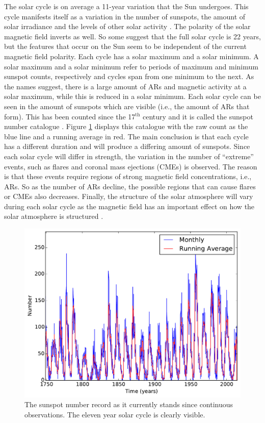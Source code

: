     The solar cycle is on average a 11-year variation that the Sun undergoes.
    This cycle manifests itself as a variation in the number of sunspots, the amount of solar irradiance and the levels of other solar activity \citep{climate}.
    The polarity of the solar magnetic field inverts as well.
    So some suggest that the full solar cycle is 22 years, but the features that occur on the Sun seem to be independent of the current magnetic field polarity. 
    Each cycle has a solar maximum and a solar minimum.
    A solar maximum and a solar minimum refer to periods of maximum and minimum sunspot counts, respectively and cycles span from one minimum to the next.
    As the names suggest, there is a large amount of ARs and magnetic activity at a solar maximum, while this is reduced in a solar minimum.
    Each solar cycle can be seen in the amount of sunspots which are visible (i.e., the amount of ARs that form).
    This has been counted since the 17$^{\mathrm{th}}$ century and it is called the sunspot number catalogue \citep{Eddy18061976}.
    Figure \ref{fig:AR_Num} displays this catalogue with the raw count as the blue line and a running average in red.
    The main conclusion is that each cycle has a different duration and will produce a differing amount of sunspots.
    Since each solar cycle will differ in strength, the variation in the number of ``extreme'' events, such as flares and coronal mass ejections (CMEs) is observed.
    The reason is that these events require regions of strong magnetic field concentrations, i.e., ARs.
    So as the number of ARs decline, the possible regions that can cause flares or CMEs also decreases.
    Finally, the structure of the solar atmosphere will vary during each solar cycle as the magnetic field has an important effect on how the solar atmosphere is structured \citep{Sven}. 

    \begin{figure}
    	\centering
    	\includegraphics[width=\textwidth]{sunspot_number.pdf}
    	\caption{
	    		 The sunspot number record as it currently stands since continuous observations.  
    		     The eleven year solar cycle is clearly visible.
    	        }
    	\label{fig:AR_Num}
    \end{figure}   
            
